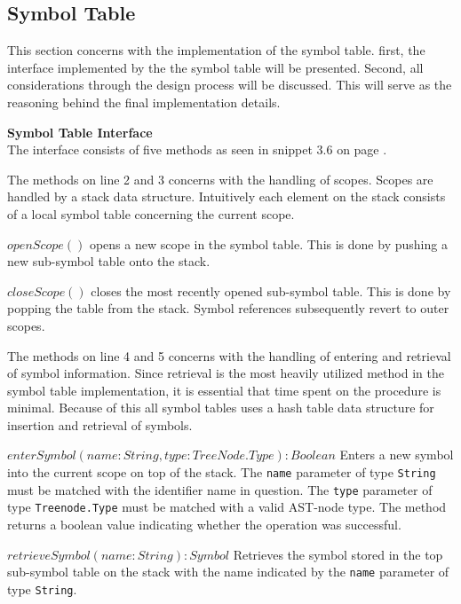 \subsection{Symbol Table}
This section concerns with the implementation of the symbol table. 
first, the interface implemented by the the symbol table will be presented.
Second, all considerations through the design process will be discussed.
This will serve as the reasoning behind the final implementation details.

\textbf{Symbol Table Interface}\\
The interface consists of five methods as seen in snippet 3.6 on page \pageref{lis:STInterface}.

The methods on line 2 and 3 concerns with the handling of scopes.
Scopes are handled by a stack data structure.
Intuitively each element on the stack consists of a local symbol table concerning the current scope.

$openScope()$ opens a new scope in the symbol table.
This is done by pushing a new sub-symbol table onto the stack.

$closeScope()$ closes the most recently opened sub-symbol table.
This is done by popping the table from the stack.
Symbol references subsequently revert to outer scopes.

The methods on line 4 and 5 concerns with the handling of entering and retrieval of symbol information.
Since retrieval is the most heavily utilized method in the symbol table implementation, it is essential that time spent on the procedure is minimal.
Because of this all symbol tables uses a hash table data structure for insertion and retrieval of symbols. 

$enterSymbol(name: String, type: TreeNode.Type): Boolean$ Enters a new symbol into the current scope on top of the stack.
The \texttt{name} parameter of type \texttt{String} must be matched with the identifier name in question.
The \texttt{type} parameter of type \texttt{Treenode.Type} must be matched with a valid AST-node type.
The method returns a boolean value indicating whether the operation was successful.

$retrieveSymbol(name: String): Symbol$ Retrieves the symbol stored in the top sub-symbol table on the stack with the name indicated by the \texttt{name} parameter of type \texttt{String}.

